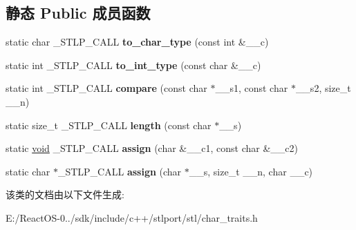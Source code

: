 \subsection*{静态 Public 成员函数}
\begin{DoxyCompactItemize}
\item 
\mbox{\label{classchar__traits_3_01char_01_4_a2da33143f62332e46cc7bc4e31566794}} 
static char \+\_\+\+S\+T\+L\+P\+\_\+\+C\+A\+LL {\bfseries to\+\_\+char\+\_\+type} (const int \&\+\_\+\+\_\+c)
\item 
\mbox{\label{classchar__traits_3_01char_01_4_a3427a7c09435d4558cafebf8307ab0ca}} 
static int \+\_\+\+S\+T\+L\+P\+\_\+\+C\+A\+LL {\bfseries to\+\_\+int\+\_\+type} (const char \&\+\_\+\+\_\+c)
\item 
\mbox{\label{classchar__traits_3_01char_01_4_ac18b755b7f672a5edf297fe6e8167bd0}} 
static int \+\_\+\+S\+T\+L\+P\+\_\+\+C\+A\+LL {\bfseries compare} (const char $\ast$\+\_\+\+\_\+s1, const char $\ast$\+\_\+\+\_\+s2, size\+\_\+t \+\_\+\+\_\+n)
\item 
\mbox{\label{classchar__traits_3_01char_01_4_a20a38f4a85e9dd09a11eb4bf511be41b}} 
static size\+\_\+t \+\_\+\+S\+T\+L\+P\+\_\+\+C\+A\+LL {\bfseries length} (const char $\ast$\+\_\+\+\_\+s)
\item 
\mbox{\label{classchar__traits_3_01char_01_4_aa670af69c9df05db264602d203e05645}} 
static \hyperlink{interfacevoid}{void} \+\_\+\+S\+T\+L\+P\+\_\+\+C\+A\+LL {\bfseries assign} (char \&\+\_\+\+\_\+c1, const char \&\+\_\+\+\_\+c2)
\item 
\mbox{\label{classchar__traits_3_01char_01_4_aa45384f4ba8e8b3a5929b3d856817b99}} 
static char $\ast$\+\_\+\+S\+T\+L\+P\+\_\+\+C\+A\+LL {\bfseries assign} (char $\ast$\+\_\+\+\_\+s, size\+\_\+t \+\_\+\+\_\+n, char \+\_\+\+\_\+c)
\end{DoxyCompactItemize}


该类的文档由以下文件生成\+:\begin{DoxyCompactItemize}
\item 
E\+:/\+React\+O\+S-\/0../sdk/include/c++/stlport/stl/char\+\_\+traits.\+h\end{DoxyCompactItemize}
